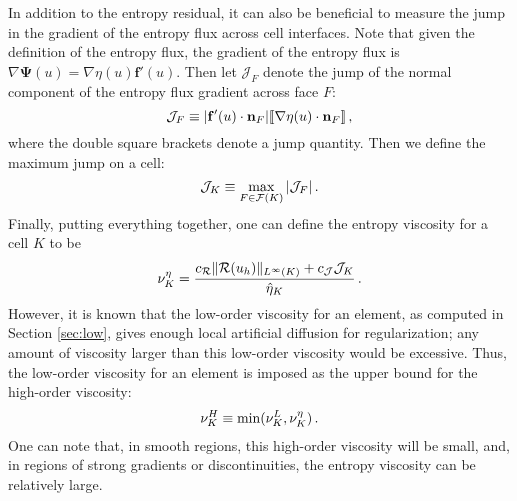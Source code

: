 In addition to the entropy residual, it can
also be beneficial to measure the jump in the gradient of the entropy flux
across cell interfaces.
Note that given the definition of the entropy flux, the gradient of the entropy
flux is $\nabla\mathbf{\Psi}(u)=\nabla\eta(u)\mathbf{f}'(u)$. Then let
$\mathcal{J}_F$ denote the jump of the normal component of the entropy flux
gradient across face $F$:
\begin{equation}
  \mathcal{J}_F \equiv |\mathbf{f}'(u)\cdot\mathbf{n}_F|
    [\![\nabla\eta(u)\cdot\mathbf{n}_F]\!] \,,
\end{equation}
where the double square brackets denote a jump quantity. Then we define the
maximum jump on a cell:
\begin{equation}
  \mathcal{J}_K \equiv \max\limits_{F\in\mathcal{F}(K)} |\mathcal{J}_F| \,.
\end{equation}
Finally, putting everything together, one can define the entropy viscosity
for a cell $K$ to be
\begin{equation}
  \nu^\eta_K = \frac{c_\mathcal{R}\|\mathcal{R}(u_h)\|_{L^\infty(K)}
    + c_\mathcal{J}\mathcal{J}_K}{\hat{\eta}_K}
    \,.
\end{equation}
However, it is known that the low-order viscosity for an element, as computed
in Section \ref{sec:low}, gives enough local artificial diffusion for
regularization; any amount of viscosity larger than this low-order viscosity would be
excessive. Thus, the low-order viscosity for an element is
imposed as the upper bound for the high-order viscosity:
\begin{equation}
  \nu^H_K \equiv \min(\nu^L_K, \nu^\eta_K) \,.
\end{equation}
One can note that, in smooth regions, this high-order viscosity will be
small, and, in regions of strong gradients or discontinuities,
the entropy viscosity can be relatively large.

